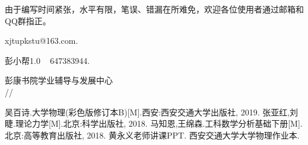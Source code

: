 \documentclass[cn,10pt,toc=twocol,device=pad,citestyle=gb7714-2015,bibstyle=gb7714-2015]{elegantbook}
\renewcommand{\today}{\number\year/\number\month/\number\day}
\begin{document}
由于编写时间紧张，水平有限，笔误、错漏在所难免，欢迎各位使用者通过邮箱和QQ群指正。

\vskip 0.3cm

\faEnvelope \quad xjtupkstu@163.com. 

\faQq \quad 彭小帮1.0 ~ 647383944.  

\begin{flushright}
彭康书院学业辅导与发展中心\\
\today
\end{flushright}



	
	
	

\tableofcontents

\mainmatter


















\clearpage
{}
{}
\begin{thebibliography}{99}  
	吴百诗.大学物理(彩色版修订本B)[M].西安:西安交通大学出版社, 2019. 
	张亚红,刘睫.理论力学[M].北京:科学出版社, 2018. 
	马知恩,王绵森.工科数学分析基础下册[M].北京:高等教育出版社, 2018. 
	黄永义老师讲课PPT.
	西安交通大学大学物理作业本. 
\end{thebibliography}

\nocite{*} 
\end{document}

